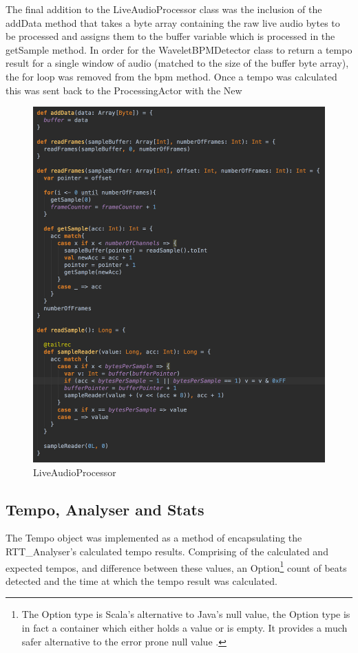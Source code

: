 \documentclass[a4paper, 11pt]{article}
\begin{document}
The final addition to the LiveAudioProcessor class was the inclusion of the addData method that takes a byte array containing the raw live audio bytes to be processed and assigns them to the buffer variable which is processed in the getSample method. In order for the WaveletBPMDetector class to return a tempo result for a single window of audio (matched to the size of the buffer byte array), the for loop was removed from the bpm method. Once a tempo was calculated this was sent back to the ProcessingActor with the New

\begin{figure}[ht]
	\centering
	\includegraphics[scale=0.25]{images/liveAudioPro.jpg}
	\caption{LiveAudioProcessor}
	\label{fig: liveAudPro}
\end{figure}


\subsection{Tempo, Analyser and Stats}
The Tempo object was implemented as a method of encapsulating the RTT\_Analyser's calculated tempo results. Comprising of the calculated and expected tempos, and difference between these values, an Option\footnote{The Option type is Scala's alternative to Java's null value, the Option type is in fact a container which either holds a value or is empty. It provides a much safer alternative to the error prone null value \cite{mariusEr}.} count of beats detected and the time at which the tempo result was calculated.\par 
\end{document}
